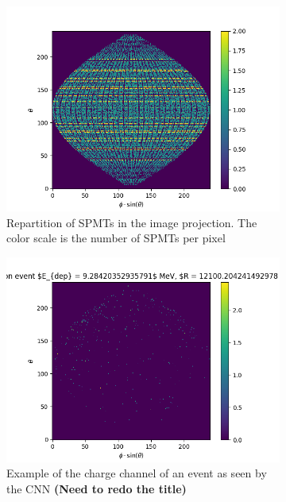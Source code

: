 \begin{figure}[ht]
  \centering
  \begin{subfigure}[b]{0.48\textwidth}
    \centering
    \includegraphics[width=\textwidth]{images/jcnn/pmt_repartition.png}
    \caption{Repartition of SPMTs in the image projection. The color scale is the number of SPMTs per pixel}
    \label{fig:jcnn:pmt_rep}
  \end{subfigure}
  \hfill
  \begin{subfigure}[b]{0.48\textwidth}
    \centering
    \includegraphics[width=\textwidth]{images/jcnn/illustration_event.png}
    \caption{Example of the charge channel of an event as seen by the CNN \textbf{(Need to redo the title)}}
    \label{fig:jcnn:event_example}
  \end{subfigure}
  \caption{}
\end{figure}

